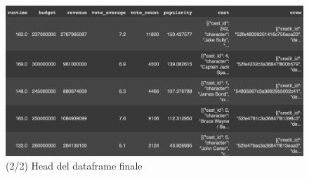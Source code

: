 \documentclass{report}
\begin{document}
        \begin{figure}[h]
            \centering
            \includegraphics[width=1\linewidth]{screenshot/movies.head2.png}
            \caption{(2/2) Head del dataframe finale}
            \label{fig:enter-label}
        \end{figure}
        
\end{document}
